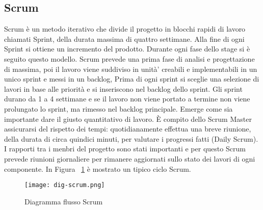\subsection{Scrum}
Scrum è un metodo iterativo che divide il progetto in blocchi rapidi di lavoro chiamati
Sprint, della durata massima di quattro settimane. Alla fine di ogni Sprint si ottiene
un incremento del prodotto. Durante ogni fase dello stage si è seguito questo modello. 
Scrum prevede una prima fase di analisi e progettazione di massima, poi il lavoro viene suddiviso in unità’ creabili e implementabili in un unico sprint e messi in un backlog, Prima di ogni sprint si sceglie una selezione di lavori in base alle priorità e si inseriscono nel backlog dello sprint. Gli sprint durano da 1 a 4 settimane e se il lavoro non viene portato a termine non viene prolungato lo sprint, ma rimesso nel backlog principale. Emerge come sia importante dare il giusto quantitativo di lavoro. È compito dello
Scrum Master assicurarsi del rispetto dei tempi: quotidianamente effettua una breve
riunione, della durata di circa quindici minuti, per valutare i progressi fatti (Daily
Scrum). I rapporti tra i menbri del progetto sono stati importanti e per questo Scrum prevede riunioni giornaliere per rimanere aggiornati sullo stato dei lavori di ogni componente.
In Figura ~\ref{fig:scrum} è mostrato un tipico ciclo Scrum.
\begin{figure}[!h]   
    \centering
    \texttt{[image: dig-scrum.png]} 
    \caption{Diagramma flusso Scrum}
    \label{fig:scrum} 
\end{figure}